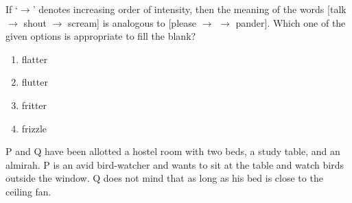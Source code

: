 \item If ‘$\rightarrow$’ denotes increasing order of intensity, then the meaning of the words
        [talk $\rightarrow$ shout $\rightarrow$ scream] is analogous to [please $\rightarrow$ \underline{\hspace{1cm}} $\rightarrow$ pander].
    Which one of the given options is appropriate to fill the blank?
    \begin{enumerate}
        \item flatter
        \item flutter
        \item fritter
        \item frizzle
    \end{enumerate}
\item P and Q have been allotted a hostel room with two beds, a study table, and an almirah. P is an avid bird-watcher and wants to sit at the table and watch birds outside the window. Q does not mind that as long as his bed is close to the ceiling fan.

